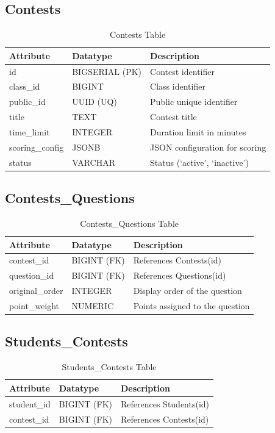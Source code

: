 \documentclass[../report_main.tex]{subfiles}
\begin{document}
\subsection{Contests}
\begin{table}[H]
\centering
\caption{Contests Table}
\label{tab:contests}
\renewcommand{\arraystretch}{1.25}
\begin{tabular}{|p{3cm}|p{3.5cm}|p{8.5cm}|}
\hline
\textbf{Attribute} & \textbf{Datatype} & \textbf{Description} \\ \hline
id & BIGSERIAL (PK) & Contest identifier \\ \hline
class\_id & BIGINT & Class identifier \\ \hline
public\_id & UUID (UQ) & Public unique identifier \\ \hline
title & TEXT & Contest title \\ \hline
time\_limit & INTEGER & Duration limit in minutes \\ \hline
scoring\_config & JSONB & JSON configuration for scoring \\ \hline
status & VARCHAR & Status (`active', `inactive') \\ \hline
\end{tabular}
\end{table}

\subsection{Contests\_Questions}
\begin{table}[H]
\centering
\caption{Contests\_Questions Table}
\label{tab:contests_questions}
\renewcommand{\arraystretch}{1.25}
\begin{tabular}{|p{3cm}|p{3.5cm}|p{8.5cm}|}
\hline
\textbf{Attribute} & \textbf{Datatype} & \textbf{Description} \\ \hline
contest\_id & BIGINT (FK) & References Contests(id) \\ \hline
question\_id & BIGINT (FK) & References Questions(id) \\ \hline
original\_order & INTEGER & Display order of the question \\ \hline
point\_weight & NUMERIC & Points assigned to the question \\ \hline
\end{tabular}
\end{table}

\subsection{Students\_Contests}
\begin{table}[H]
\centering
\caption{Students\_Contests Table}
\label{tab:students_contests}
\renewcommand{\arraystretch}{1.25}
\begin{tabular}{|p{3cm}|p{3.5cm}|p{8.5cm}|}
\hline
\textbf{Attribute} & \textbf{Datatype} & \textbf{Description} \\ \hline
student\_id & BIGINT (FK) & References Students(id) \\ \hline
contest\_id & BIGINT (FK) & References Contests(id) \\ \hline
\end{tabular}
\end{table}
\end{document}

